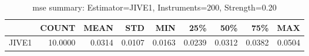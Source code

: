 \begin{table}[ht]
\centering
\caption{mse summary: Estimator=JIVE1, Instruments=200, Strength=0.20}
\begin{tabular}{lrrrrrrrr}
\toprule
 & COUNT & MEAN & STD & MIN & 25\% & 50\% & 75\% & MAX \\
\midrule
JIVE1 & 10.0000 & 0.0314 & 0.0107 & 0.0163 & 0.0239 & 0.0312 & 0.0382 & 0.0504 \\
\bottomrule
\end{tabular}
\end{table}
